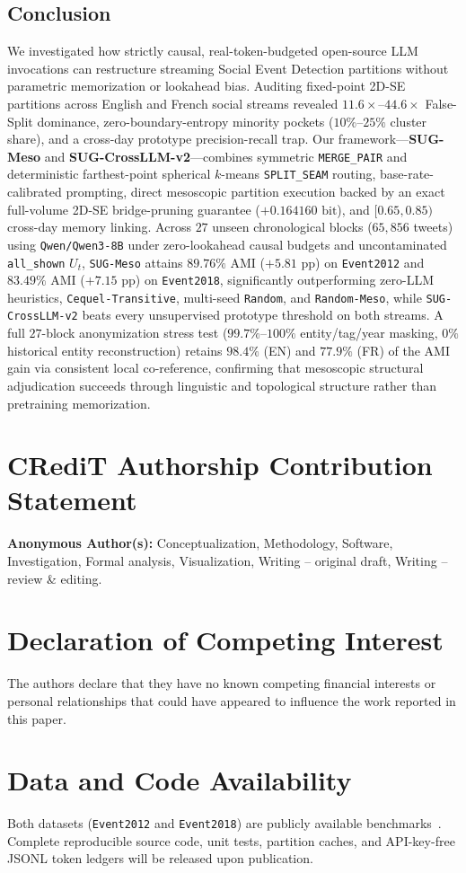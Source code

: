 \subsection{Conclusion}
We investigated how strictly causal, real-token-budgeted open-source LLM invocations can restructure streaming Social Event Detection partitions without parametric memorization or lookahead bias. Auditing fixed-point 2D-SE partitions across English and French social streams revealed $11.6\times$--$44.6\times$ False-Split dominance, zero-boundary-entropy minority pockets ($10\%$--$25\%$ cluster share), and a cross-day prototype precision-recall trap. Our framework---\textbf{SUG-Meso} and \textbf{SUG-CrossLLM-v2}---combines symmetric \texttt{MERGE\_PAIR} and deterministic farthest-point spherical $k$-means \texttt{SPLIT\_SEAM} routing, base-rate-calibrated prompting, direct mesoscopic partition execution backed by an exact full-volume 2D-SE bridge-pruning guarantee ($+0.164160\text{ bit}$), and $[0.65, 0.85)$ cross-day memory linking. Across $27$ unseen chronological blocks ($65{,}856$ tweets) using \texttt{Qwen/Qwen3-8B} under zero-lookahead causal budgets and uncontaminated \texttt{all\_shown} $U_t$, \texttt{SUG-Meso} attains $89.76\%$ AMI ($+5.81\text{ pp}$) on \texttt{Event2012} and $83.49\%$ AMI ($+7.15\text{ pp}$) on \texttt{Event2018}, significantly outperforming zero-LLM heuristics, \texttt{Cequel-Transitive}, multi-seed \texttt{Random}, and \texttt{Random-Meso}, while \texttt{SUG-CrossLLM-v2} beats every unsupervised prototype threshold on both streams. A full $27$-block anonymization stress test ($99.7\%$--$100\%$ entity/tag/year masking, $0\%$ historical entity reconstruction) retains $98.4\%$ (EN) and $77.9\%$ (FR) of the AMI gain via consistent local co-reference, confirming that mesoscopic structural adjudication succeeds through linguistic and topological structure rather than pretraining memorization.

\section*{CRediT Authorship Contribution Statement}
\textbf{Anonymous Author(s):} Conceptualization, Methodology, Software, Investigation, Formal analysis, Visualization, Writing -- original draft, Writing -- review \& editing.

\section*{Declaration of Competing Interest}
The authors declare that they have no known competing financial interests or personal relationships that could have appeared to influence the work reported in this paper.

\section*{Data and Code Availability}
Both datasets (\texttt{Event2012} and \texttt{Event2018}) are publicly available benchmarks~\citep{mcminn2013building,mazoyer2020french}. Complete reproducible source code, unit tests, partition caches, and API-key-free JSONL token ledgers will be released upon publication.
